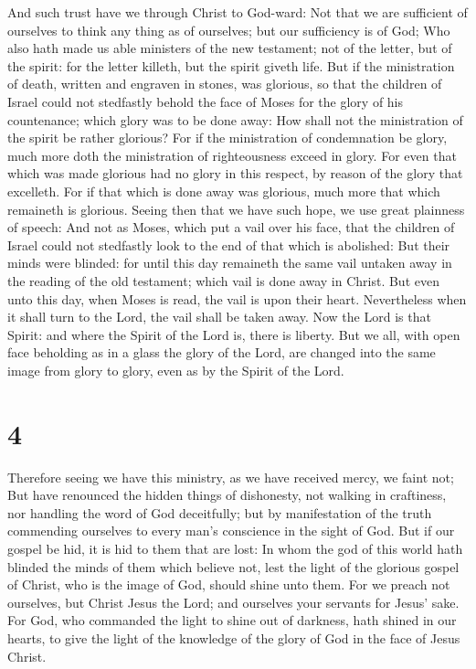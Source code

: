 And such trust have we through Christ to God-ward:
 Not that we are sufficient of ourselves to think any thing
as of ourselves; but our sufficiency is of God;  Who also
hath made us able ministers of the new testament; not of the letter, but
of the spirit: for the letter killeth, but the spirit giveth life.
 But if the ministration of death, written and engraven in
stones, was glorious, so that the children of Israel could not
stedfastly behold the face of Moses for the glory of his countenance;
which glory was to be done away:  How shall not the
ministration of the spirit be rather glorious?  For if the
ministration of condemnation be glory, much more doth the ministration
of righteousness exceed in glory.  For even that which was
made glorious had no glory in this respect, by reason of the glory that
excelleth.  For if that which is done away was glorious,
much more that which remaineth is glorious.  Seeing then
that we have such hope, we use great plainness of speech: 
And not as Moses, which put a vail over his face, that the children of
Israel could not stedfastly look to the end of that which is abolished:
 But their minds were blinded: for until this day remaineth
the same vail untaken away in the reading of the old testament; which
vail is done away in Christ.  But even unto this day, when
Moses is read, the vail is upon their heart.  Nevertheless
when it shall turn to the Lord, the vail shall be taken away.
 Now the Lord is that Spirit: and where the Spirit of the
Lord is, there is liberty.  But we all, with open face
beholding as in a glass the glory of the Lord, are changed into the same
image from glory to glory, even as by the Spirit of the Lord.

\hypertarget{section-3}{%
\section{4}\label{section-3}}

 Therefore seeing we have this ministry, as we have received
mercy, we faint not;  But have renounced the hidden things
of dishonesty, not walking in craftiness, nor handling the word of God
deceitfully; but by manifestation of the truth commending ourselves to
every man's conscience in the sight of God.  But if our
gospel be hid, it is hid to them that are lost:  In whom the
god of this world hath blinded the minds of them which believe not, lest
the light of the glorious gospel of Christ, who is the image of God,
should shine unto them.  For we preach not ourselves, but
Christ Jesus the Lord; and ourselves your servants for Jesus' sake.
 For God, who commanded the light to shine out of darkness,
hath shined in our hearts, to give the light of the knowledge of the
glory of God in the face of Jesus Christ.

